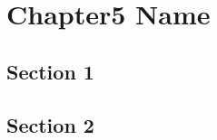 
\chapter{Chapter5 Name} %
\label{ch:chapter5}
\lipsum[50]

\section{Section 1}
\lipsum[50]

\section{Section 2}
\lipsum[50]